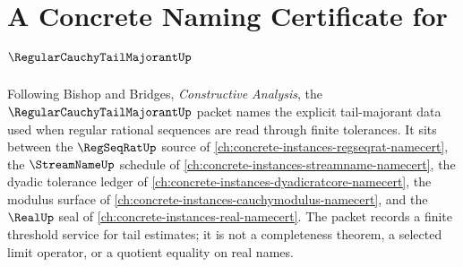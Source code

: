 \chapter{A Concrete Naming Certificate for $\RegularCauchyTailMajorantUp$}
\label{ch:concrete-instances-regular-cauchy-tail-majorant-namecert}

Following Bishop and Bridges, \emph{Constructive Analysis}, the $\RegularCauchyTailMajorantUp$ packet names the explicit tail-majorant data used when regular rational sequences are read through finite tolerances. It sits between the $\RegSeqRatUp$ source of \autoref{ch:concrete-instances-regseqrat-namecert}, the $\StreamNameUp$ schedule of \autoref{ch:concrete-instances-streamname-namecert}, the dyadic tolerance ledger of \autoref{ch:concrete-instances-dyadicratcore-namecert}, the modulus surface of \autoref{ch:concrete-instances-cauchymodulus-namecert}, and the $\RealUp$ seal of \autoref{ch:concrete-instances-real-namecert}. The packet records a finite threshold service for tail estimates; it is not a completeness theorem, a selected limit operator, or a quotient equality on real names.



